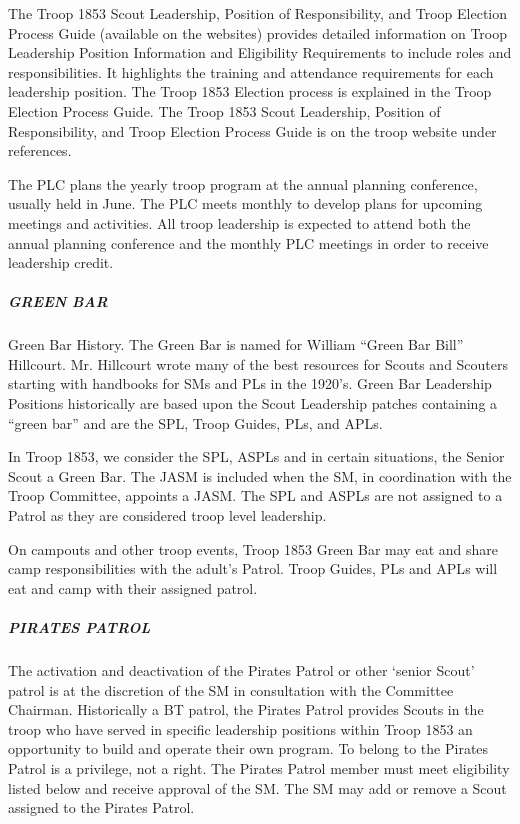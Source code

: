 \documentclass{ltxguide}
\begin{document}
The Troop 1853 Scout Leadership, Position of Responsibility, and Troop Election
Process Guide (available on the websites) provides detailed information on Troop Leadership Position Information and Eligibility Requirements to include roles and responsibilities. It highlights the training and attendance requirements for each leadership position. The Troop 1853 Election process is explained in the Troop Election Process Guide. The Troop 1853 Scout Leadership, Position of Responsibility, and Troop Election Process Guide is on the troop website under references.

The \ac{PLC} plans the yearly troop program at the annual planning conference,  usually held in June. The \ac{PLC} meets monthly to develop plans for upcoming meetings and activities. All troop leadership is expected to attend both the annual planning conference and the monthly \ac{PLC} meetings in order to receive leadership credit.

\subparagraph{GREEN BAR}
Green Bar History. The Green Bar is named for William “Green Bar Bill” Hillcourt. Mr. Hillcourt wrote many of the best resources for Scouts and Scouters starting with handbooks for \acp{SM} and \acp{PL} in the 1920's. Green Bar Leadership Positions historically are based upon the Scout Leadership patches containing a “green bar” and are the \ac{SPL}, Troop Guides, \acp{PL}, and \ac{APL}s.

In Troop 1853, we consider the \ac{SPL}, \acp{ASPL} and in certain situations, the Senior Scout a Green Bar. The \ac{JASM} is included when the \ac{SM}, in coordination with the Troop Committee, appoints a \ac{JASM}. The \ac{SPL} and \acp{ASPL} are not assigned to a Patrol as they are considered troop level leadership.

On campouts and other troop events, Troop 1853 Green Bar may eat and share camp responsibilities with the adult's Patrol. Troop Guides, \acp{PL} and \ac{APL}s will eat and camp with their assigned patrol.

\subparagraph{PIRATES PATROL}
The activation and deactivation of the Pirates Patrol or other ‘senior Scout' patrol is at the discretion of the \ac{SM} in consultation with the Committee Chairman.
Historically a \ac{BT} patrol, the Pirates Patrol provides Scouts in the troop who have served in specific leadership positions within Troop 1853 an opportunity to build and operate their own program. To belong to the Pirates Patrol is a privilege, not a right. The Pirates Patrol member must meet eligibility listed below and receive approval of the \ac{SM}. The \ac{SM} may add or remove a Scout assigned to the Pirates Patrol. 
\end{document}
